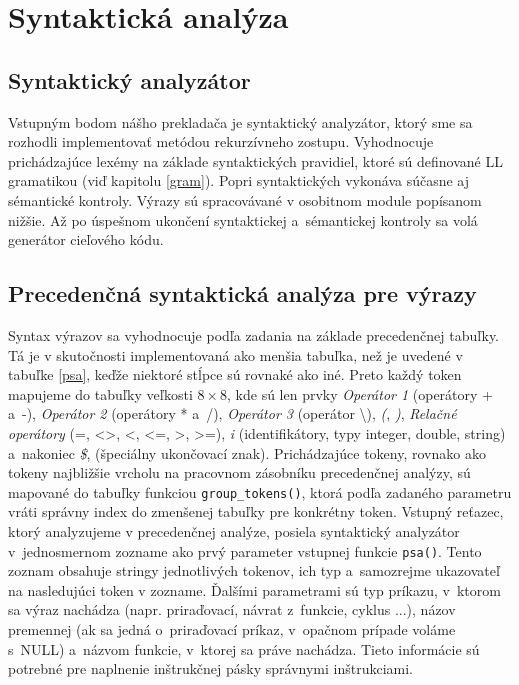 \documentclass[14pt, a4paper]{extarticle}
\begin{document}
\section{Syntaktická analýza}

\subsection{Syntaktický analyzátor}

Vstupným bodom nášho prekladača je syntaktický analyzátor, ktorý sme sa rozhodli implementovať metódou rekurzívneho zostupu. Vyhodnocuje prichádzajúce lexémy na základe syntaktických pravidiel, ktoré sú definované LL gramatikou (viď kapitolu \ref{gram}). Popri syntaktických vykonáva súčasne aj sémantické kontroly. Výrazy sú spracovávané v osobitnom module popísanom nižšie. Až po úspešnom ukončení syntaktickej a~sémantickej kontroly sa volá generátor cieľového kódu. 

\subsection{Precedenčná syntaktická analýza pre výrazy}

Syntax výrazov sa vyhodnocuje podľa zadania na základe precedenčnej tabuľky. Tá je v skutočnosti implementovaná ako menšia tabuľka, než je uvedené v tabuľke \ref{psa}, keďže niektoré stĺpce sú rovnaké ako iné. Preto každý token mapujeme do tabuľky veľkosti $8\times8$, kde sú len prvky \textit{Operátor 1} (operátory + a~-), \textit{Operátor 2} (operátory * a~/), \textit{Operátor 3} (operátor \textbackslash), \textit{(}, \textit{)}, \textit{Relačné operátory} (=, <>, <, <=, >, >=), \textit{i} (identifikátory, typy integer, double, string) a~nakoniec \textit{\$}, (špeciálny ukončovací znak). Prichádzajúce tokeny, rovnako ako tokeny najbližšie vrcholu na pracovnom zásobníku precedenčnej analýzy, sú mapované do tabuľky funkciou \texttt{group\_tokens()}, ktorá podľa zadaného parametru vráti správny index do zmenšenej tabuľky pre konkrétny token. Vstupný reťazec, ktorý analyzujeme v precedenčnej analýze, posiela syntaktický analyzátor v~jednosmernom zozname ako prvý parameter vstupnej funkcie \texttt{psa()}. Tento zoznam obsahuje stringy jednotlivých tokenov, ich typ a~samozrejme ukazovateľ na nasledujúci token v zozname. Ďalšími parametrami sú typ príkazu, v~ktorom sa výraz nachádza (napr. priraďovací, návrat z~funkcie, cyklus ...), názov premennej (ak sa jedná o~priraďovací príkaz, v~opačnom prípade voláme s~NULL) a~názvom funkcie, v~ktorej sa práve nachádza. Tieto informácie sú potrebné pre naplnenie inštrukčnej pásky správnymi inštrukciami.  \\
\end{document}
